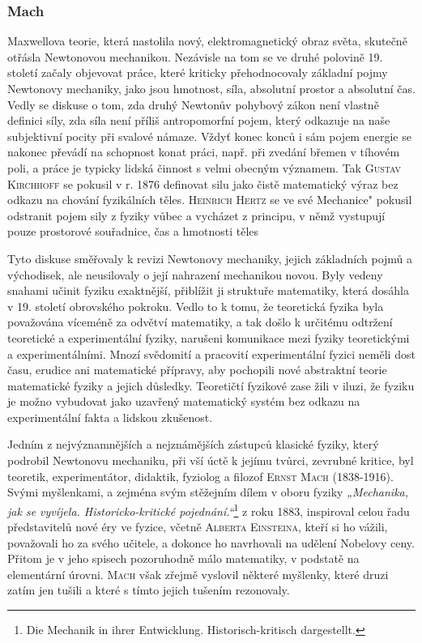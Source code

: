       \subsubsection{Mach}\label{fyz:IchapIIsecIVssecIsssecV}
        Maxwellova teorie, která nastolila nový, elektromagnetický obraz světa, skutečně otřásla
        Newtonovou mechanikou. Nezávisle na tom se ve druhé polovině 19. století začaly objevovat
        práce, které kriticky přehodnocovaly základní pojmy Newtonovy mechaniky, jako jsou hmotnost,
        síla, absolutní prostor a absolutní čas. Vedly se diskuse o tom, zda druhý Newtonův pohybový
        zákon není vlastně definici síly, zda síla není příliš antropomorfní pojem, který odkazuje
        na naše subjektivní pocity při svalové námaze. Vždyť konec konců i sám pojem energie se
        nakonec převádí na schopnost konat práci, např. při zvedání břemen v tíhovém poli, a práce
        je typicky lidská činnost s velmi obecným významem. Tak \textsc{Gustav Kirchhoff} se pokusil
        v r. 1876 definovat silu jako čistě matematický výraz bez odkazu na chování fyzikálních
        těles. \textsc{Heinrich Hertz} se ve své Mechanice" pokusil odstranit pojem sily z fyziky
        vůbec a vycházet z principu, v němž vystupují pouze prostorové souřadnice, čas a hmotnosti
        těles

        Tyto diskuse směřovaly k revizi Newtonovy mechaniky, jejich základních pojmů a východisek,
        ale neusilovaly o její nahrazení mechanikou novou. Byly vedeny snahami učinit fyziku
        exaktnější, přiblížit ji struktuře matematiky, která dosáhla v 19. století obrovského
        pokroku. Vedlo to k tomu, že teoretická fyzika byla považována víceméně za odvětví
        matematiky, a tak došlo k určitému odtržení teoretické a experimentální fyziky, narušeni
        komunikace mezi fyziky teoretickými a experimentálními. Mnozí svědomití a pracovití
        experimentální fyzici neměli dost času, erudice ani matematické přípravy, aby pochopili nové
        abstraktní teorie matematické fyziky a jejich důsledky. Teoretičtí fyzikové zase žili v
        iluzi, že fyziku je možno vybudovat jako uzavřený matematický systém bez odkazu na
        experimentální fakta a lidskou zkušenost.

        Jedním z nejvýznamnějších a nejznámějších zástupců klasické fyziky, který podrobil Newtonovu
        mechaniku, při vší úctě k jejímu tvůrci, zevrubné kritice, byl teoretik, experimentátor,
        didaktik, fyziolog a filozof \textsc{Ernst Mach} (1838-1916). Svými myšlenkami, a zejména
        svým stěžejním dílem v oboru fyziky \emph{„Mechanika, jak se vyvíjela. Historicko-kritické
        pojednání.“}\footnote{Die Mechanik in ihrer Entwicklung. Historisch-kritisch dargestellt.} z
        roku 1883, inspiroval celou řadu představitelů nové éry ve fyzice, včetně \textsc{Alberta
        Einsteina}, kteří si ho vážili, považovali ho za svého učitele, a dokonce ho navrhovali na
        udělení Nobelovy ceny. Přitom je v jeho spisech pozoruhodně málo matematiky, v podstatě na
        elementární úrovni. \textsc{Mach} však zřejmě vyslovil některé myšlenky, které druzi zatím
        jen tušili a které s tímto jejich tušením rezonovaly.

